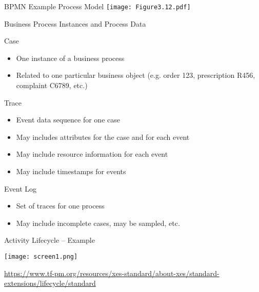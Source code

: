\documentclass[ignorenonframetext,xcolor=x11names]{beamer}
\begin{document}
\begin{frame}{BPMN Example Process Model}
\centering
\texttt{[image: Figure3.12.pdf]}
\end{frame}

\begin{frame}{Business Process Instances and Process Data}
\begin{block}{Case}
\begin{itemize}
   \item One instance of a business process
   \item Related to one particular business object (e.g. order 123, prescription R456, complaint C6789, etc.)
\end{itemize}
\end{block}
\begin{block}{Trace}
\begin{itemize}
   \item Event data sequence for one case
   \item May includes attributes for the case and for each event
   \item May include resource information for each event
   \item May include timestamps for events
\end{itemize}
\end{block}
\begin{block}{Event Log}
\begin{itemize}
   \item Set of traces for one process
   \item May include incomplete cases, may be sampled, etc.
\end{itemize}
\end{block}
\end{frame}

\begin{frame}{Activity Lifecycle -- Example}
\centering

\texttt{[image: screen1.png]}

\scriptsize\url{https://www.tf-pm.org/resources/xes-standard/about-xes/standard-extensions/lifecycle/standard}
\normalsize
\end{frame}
\end{document}
